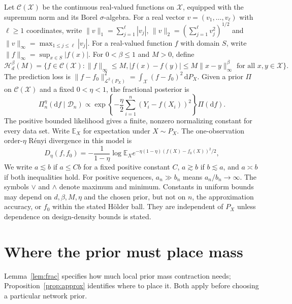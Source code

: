\documentclass[11pt,a4paper]{article}
\theoremstyle{remark}
\newcommand{\Xcal}{\mathcal X}
\newcommand{\Hcal}{\mathcal H}
\newcommand{\Dcal}{\mathcal D}
\newcommand{\Lcal}{\mathcal L}
\newcommand{\Ccal}{\mathcal C}
\newcommand{\E}{\mathbb E}
\newcommand{\norm}[1]{\lVert#1\rVert}
\begin{document}
Let $\Ccal(\Xcal)$ be the continuous real-valued functions on
$\Xcal$, equipped with the supremum norm and its Borel
$\sigma$-algebra. For a real vector $v=(v_1,\ldots,v_\ell)$
with $\ell\geq1$ coordinates, write
$\norm v_1=\sum_{j=1}^\ell|v_j|$,
$\norm v_2=(\sum_{j=1}^\ell v_j^2)^{1/2}$ and
$\norm v_\infty=\max_{1\leq j\leq\ell}|v_j|$. For a real-valued function $f$
with domain $S$, write $\norm f_\infty=\sup_{x\in S}|f(x)|$.
For $0<\beta\leq1$ and $M>0$, define
\begin{equation}\label{eq:holder}
\Hcal_d^\beta(M)=\bigl\{f\in\Ccal(\Xcal):\norm f_\infty\leq M,
|f(x)-f(y)|\leq M\norm{x-y}_\infty^\beta\text{ for all }x,y\in\Xcal\bigr\}.
\end{equation}
The prediction loss is
$\norm{f-f_0}_{\Lcal^2(P_X)}^2
=\int_\Xcal(f-f_0)^2\,\mathrm dP_X$. Given a prior $\Pi$ on $\Ccal(\Xcal)$ and a fixed
$0<\eta<1$, the fractional posterior is
\begin{equation}\label{eq:posterior}
\Pi_n^\eta(\mathrm d f\mid\Dcal_n)\propto
\exp\!\left\{-\frac\eta2\sum_{i=1}^n
(Y_i-f(X_i))^2\right\}\Pi(\mathrm d f).
\end{equation}
The positive bounded likelihood gives a finite, nonzero normalizing
constant for every data set.
Write $\E_X$ for expectation under $X\sim P_X$.
The one-observation order-$\eta$ R\'enyi divergence in this model is
\begin{equation}\label{eq:renyi}
D_\eta(f,f_0)=-\frac1{1-\eta}\log\E_X
 e^{-\eta(1-\eta)(f(X)-f_0(X))^2/2},
\end{equation}
We write $a\lesssim b$ if $a\leq Cb$ for a fixed positive constant
$C$, $a\gtrsim b$ if $b\lesssim a$, and $a\asymp b$ if both
inequalities hold. For positive sequences, $a_n\gg b_n$ means
$a_n/b_n\to\infty$. The symbols $\vee$ and $\wedge$ denote maximum
and minimum. Constants in uniform
bounds may depend on $d,\beta,M,\eta$ and the chosen prior, but not
on $n$, the approximation accuracy, or $f_0$ within the stated
H\"older ball. They are independent of $P_X$ unless dependence on
design-density bounds is stated.

\section{Where the prior must place mass}
\label{sec:prior-mass}

Lemma~\ref{lem:frac} specifies how much local prior mass contraction
needs; Proposition~\ref{prop:approx} identifies where to place it.
Both apply before choosing a particular network prior.
\end{document}
